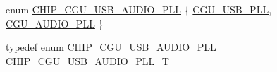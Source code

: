 \begin{DoxyCompactItemize}
\item 
enum \hyperlink{group___c_l_o_c_k__18_x_x__43_x_x_gabdd04536f16b3c7b588757d024e53da6}{C\+H\+I\+P\+\_\+\+C\+G\+U\+\_\+\+U\+S\+B\+\_\+\+A\+U\+D\+I\+O\+\_\+\+P\+LL} \{ \hyperlink{group___c_l_o_c_k__18_x_x__43_x_x_ggabdd04536f16b3c7b588757d024e53da6a9c58406347e31448cf1af5069bfa8618}{C\+G\+U\+\_\+\+U\+S\+B\+\_\+\+P\+LL}, 
\hyperlink{group___c_l_o_c_k__18_x_x__43_x_x_ggabdd04536f16b3c7b588757d024e53da6a417d44002637aeeb1b62b42c39723cc1}{C\+G\+U\+\_\+\+A\+U\+D\+I\+O\+\_\+\+P\+LL}
 \}
\item 
typedef enum \hyperlink{group___c_l_o_c_k__18_x_x__43_x_x_gabdd04536f16b3c7b588757d024e53da6}{C\+H\+I\+P\+\_\+\+C\+G\+U\+\_\+\+U\+S\+B\+\_\+\+A\+U\+D\+I\+O\+\_\+\+P\+LL} \hyperlink{group___c_l_o_c_k__18_x_x__43_x_x_ga839a458a9e1e2a85e68470156c861e6a}{C\+H\+I\+P\+\_\+\+C\+G\+U\+\_\+\+U\+S\+B\+\_\+\+A\+U\+D\+I\+O\+\_\+\+P\+L\+L\+\_\+T}
\end{DoxyCompactItemize}
